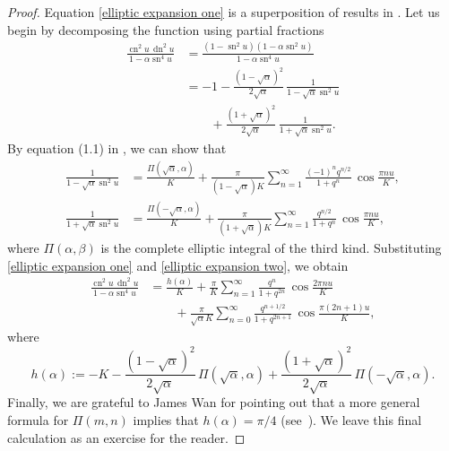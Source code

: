 \documentclass[12pt,reqno]{amsart}
\theoremstyle{remark}
\begin{document}
\begin{proof}
Equation \eqref{elliptic expansion one}
is a superposition of results in \cite{wanli}.  Let us begin by
decomposing the function using partial fractions
\begin{align*}
\frac{{\operatorname{cn}}^2u\,{\operatorname{dn}}^2u}{1-\alpha{\operatorname{sn}}^4u}
&=\frac{(1-{\operatorname{sn}}^2u)(1-\alpha{\operatorname{sn}}^2u)}{1-\alpha{\operatorname{sn}}^4u}
\\
&=-1-\frac{(1-\sqrt{\alpha})^2}{2\sqrt{\alpha}}\,\frac{1}{1-\sqrt{\alpha}{\operatorname{sn}}^2u}
\\ &\qquad
+\frac{(1+\sqrt{\alpha})^2}{2\sqrt{\alpha}}\,\frac{1}{1+\sqrt{\alpha}{\operatorname{sn}}^2u}.
\end{align*}
By equation (1.1) in \cite[~pg. 543]{wanli}, we can show that
\begin{align}
\frac{1}{1-\sqrt{\alpha}{\operatorname{sn}}^2u}
&=\frac{\Pi(\sqrt{\alpha},\alpha)}{K}
+\frac{\pi}{(1-\sqrt{\alpha})K}\sum_{n=1}^{\infty}\frac{(-1)^nq^{n/2}}{1+q^n}\,\cos\frac{\pi n u}{K},
\label{elliptic expansion one}
\\
\frac{1}{1+\sqrt{\alpha}{\operatorname{sn}}^2u}
&=\frac{\Pi(-\sqrt{\alpha},\alpha)}{K}
+\frac{\pi}{(1+\sqrt{\alpha})K}\sum_{n=1}^{\infty}\frac{q^{n/2}}{1+q^n}\,\cos\frac{\pi n u}{K},
\label{elliptic expansion two}
\end{align}
where $\Pi(\alpha,\beta)$ is the complete elliptic integral of the
third kind.  Substituting \eqref{elliptic expansion one} and
\eqref{elliptic expansion two}, we obtain
\begin{equation*}
\begin{split}
\frac{{\operatorname{cn}}^2u\,{\operatorname{dn}}^2u}{1-\alpha{\operatorname{sn}}^4u}
&=\frac{h(\alpha)}{K}+\frac{\pi}{K}\sum_{n=1}^{\infty}\frac{q^n}{1+q^{2n}}\,\cos\frac{2\pi n u}{K}
\\ &\qquad
+\frac{\pi}{\sqrt{\alpha}K}\sum_{n=0}^{\infty}\frac{q^{n+1/2}}{1+q^{2n+1}}\,\cos\frac{\pi(2n+1)u}{K},
\end{split}
\end{equation*}
where
\begin{equation*}
h(\alpha):=-K-\frac{(1-\sqrt{\alpha})^2}{2\sqrt{\alpha}}\,\Pi(\sqrt{\alpha},\alpha)
+\frac{(1+\sqrt{\alpha})^2}{2\sqrt{\alpha}}\,\Pi(-\sqrt{\alpha},\alpha).
\end{equation*}
Finally, we are grateful to James Wan for pointing out that a more
general formula for $\Pi(m,n)$ implies that $h(\alpha)=\pi/4$
(see~\cite{We}). We leave this final calculation as an exercise for
the reader.
\end{proof}
\end{document}
